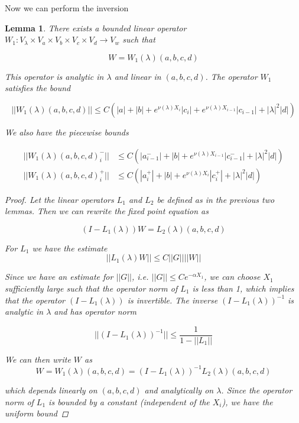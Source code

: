 \documentclass[12pt]{article}
\newtheorem{lemma}{Lemma}
\begin{document}
Now we can perform the inversion


\begin{lemma}\label{W1}
There exists a bounded linear operator $W_1: V_\lambda \times V_a \times V_b \times V_c \times V_d \rightarrow V_w$ such that 

\[
W = W_1(\lambda)(a,b,c,d)
\]

This operator is analytic in $\lambda$ and linear in $(a, b, c, d)$. The operator $W_1$ satisfies the bound

\begin{equation}\label{W1bound}
||W_1(\lambda)(a,b,c,d)|| \leq C ( |a| + |b| + e^{\nu(\lambda)X_i}|c_i| + e^{\nu(\lambda)X_{i-1}}|c_{i-1}| + |\lambda|^2 |d| )
\end{equation}

We also have the piecewise bounds

\begin{align*}
||W_1(\lambda)(a,b,c,d)_i^-|| &\leq C ( |a_{i-1}^-| + |b| + e^{\nu(\lambda)X_{i-1}}|c_{i-1}^-| + |\lambda|^2 |d| ) \\
||W_1(\lambda)(a,b,c,d)_i^+|| &\leq C ( |a_i^+| + |b| + e^{\nu(\lambda)X_i}|c_i^+| + |\lambda|^2 |d| )
\end{align*}

\begin{proof}
Let the linear operators $L_1$ and $L_2$ be defined as in the previous two lemmas. Then we can rewrite the fixed point equation as

\[
(I - L_1(\lambda))W = L_2(\lambda)(a,b,c,d)
\]

For $L_1$ we have the estimate
\[
||L_1(\lambda)W|| \leq C ||G|| ||W||
\]

Since we have an estimate for $||G||$, i.e. $||G|| \leq C e^{-\alpha X_1}$, we can choose $X_1$ sufficiently large such that the operator norm of $L_1$ is less than 1, which implies that the operator $(I - L_1(\lambda))$ is invertible. The inverse $(I - L_1(\lambda))^{-1}$ is analytic in $\lambda$ and has operator norm 

\[
||(I - L_1(\lambda))^{-1}|| \leq \frac{1}{1 - ||L_1||}
\]

We can then write $W$ as
\[
W = W_1(\lambda)(a,b,c,d) = (I - L_1(\lambda))^{-1} L_2(\lambda)(a,b,c,d)
\]

which depends linearly on $(a,b,c,d)$ and analytically on $\lambda$. Since the operator norm of $L_1$ is bounded by a constant (independent of the $X_i$), we have the uniform bound


\end{proof}
\end{lemma}
\end{document}
